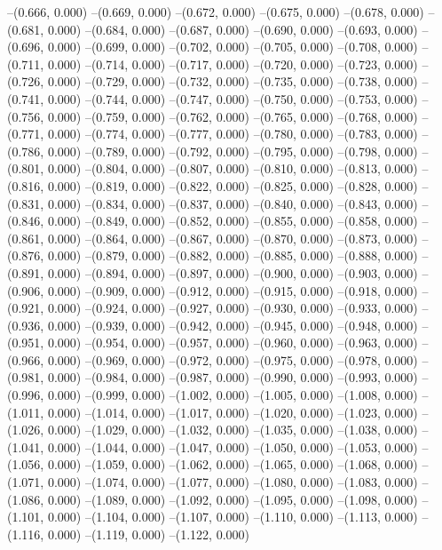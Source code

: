 --(0.666, 0.000)
--(0.669, 0.000)
--(0.672, 0.000)
--(0.675, 0.000)
--(0.678, 0.000)
--(0.681, 0.000)
--(0.684, 0.000)
--(0.687, 0.000)
--(0.690, 0.000)
--(0.693, 0.000)
--(0.696, 0.000)
--(0.699, 0.000)
--(0.702, 0.000)
--(0.705, 0.000)
--(0.708, 0.000)
--(0.711, 0.000)
--(0.714, 0.000)
--(0.717, 0.000)
--(0.720, 0.000)
--(0.723, 0.000)
--(0.726, 0.000)
--(0.729, 0.000)
--(0.732, 0.000)
--(0.735, 0.000)
--(0.738, 0.000)
--(0.741, 0.000)
--(0.744, 0.000)
--(0.747, 0.000)
--(0.750, 0.000)
--(0.753, 0.000)
--(0.756, 0.000)
--(0.759, 0.000)
--(0.762, 0.000)
--(0.765, 0.000)
--(0.768, 0.000)
--(0.771, 0.000)
--(0.774, 0.000)
--(0.777, 0.000)
--(0.780, 0.000)
--(0.783, 0.000)
--(0.786, 0.000)
--(0.789, 0.000)
--(0.792, 0.000)
--(0.795, 0.000)
--(0.798, 0.000)
--(0.801, 0.000)
--(0.804, 0.000)
--(0.807, 0.000)
--(0.810, 0.000)
--(0.813, 0.000)
--(0.816, 0.000)
--(0.819, 0.000)
--(0.822, 0.000)
--(0.825, 0.000)
--(0.828, 0.000)
--(0.831, 0.000)
--(0.834, 0.000)
--(0.837, 0.000)
--(0.840, 0.000)
--(0.843, 0.000)
--(0.846, 0.000)
--(0.849, 0.000)
--(0.852, 0.000)
--(0.855, 0.000)
--(0.858, 0.000)
--(0.861, 0.000)
--(0.864, 0.000)
--(0.867, 0.000)
--(0.870, 0.000)
--(0.873, 0.000)
--(0.876, 0.000)
--(0.879, 0.000)
--(0.882, 0.000)
--(0.885, 0.000)
--(0.888, 0.000)
--(0.891, 0.000)
--(0.894, 0.000)
--(0.897, 0.000)
--(0.900, 0.000)
--(0.903, 0.000)
--(0.906, 0.000)
--(0.909, 0.000)
--(0.912, 0.000)
--(0.915, 0.000)
--(0.918, 0.000)
--(0.921, 0.000)
--(0.924, 0.000)
--(0.927, 0.000)
--(0.930, 0.000)
--(0.933, 0.000)
--(0.936, 0.000)
--(0.939, 0.000)
--(0.942, 0.000)
--(0.945, 0.000)
--(0.948, 0.000)
--(0.951, 0.000)
--(0.954, 0.000)
--(0.957, 0.000)
--(0.960, 0.000)
--(0.963, 0.000)
--(0.966, 0.000)
--(0.969, 0.000)
--(0.972, 0.000)
--(0.975, 0.000)
--(0.978, 0.000)
--(0.981, 0.000)
--(0.984, 0.000)
--(0.987, 0.000)
--(0.990, 0.000)
--(0.993, 0.000)
--(0.996, 0.000)
--(0.999, 0.000)
--(1.002, 0.000)
--(1.005, 0.000)
--(1.008, 0.000)
--(1.011, 0.000)
--(1.014, 0.000)
--(1.017, 0.000)
--(1.020, 0.000)
--(1.023, 0.000)
--(1.026, 0.000)
--(1.029, 0.000)
--(1.032, 0.000)
--(1.035, 0.000)
--(1.038, 0.000)
--(1.041, 0.000)
--(1.044, 0.000)
--(1.047, 0.000)
--(1.050, 0.000)
--(1.053, 0.000)
--(1.056, 0.000)
--(1.059, 0.000)
--(1.062, 0.000)
--(1.065, 0.000)
--(1.068, 0.000)
--(1.071, 0.000)
--(1.074, 0.000)
--(1.077, 0.000)
--(1.080, 0.000)
--(1.083, 0.000)
--(1.086, 0.000)
--(1.089, 0.000)
--(1.092, 0.000)
--(1.095, 0.000)
--(1.098, 0.000)
--(1.101, 0.000)
--(1.104, 0.000)
--(1.107, 0.000)
--(1.110, 0.000)
--(1.113, 0.000)
--(1.116, 0.000)
--(1.119, 0.000)
--(1.122, 0.000)
